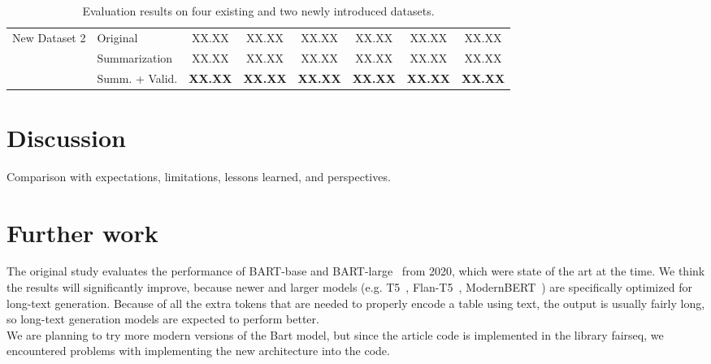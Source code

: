 \documentclass[12pt,a4paper]{article}
\begin{document}
\begin{table}[h]
\begin{tabular}{llccc|ccc}
        \midrule
        \multirow{3}{*}{New Dataset 2} 
        & Original & XX.XX & XX.XX & XX.XX & XX.XX & XX.XX & XX.XX \\
        & Summarization & XX.XX & XX.XX & XX.XX & XX.XX & XX.XX & XX.XX \\
        & Summ. + Valid. & \textbf{XX.XX} & \textbf{XX.XX} & \textbf{XX.XX} & \textbf{XX.XX} & \textbf{XX.XX} & \textbf{XX.XX} \\
        \bottomrule
    \end{tabular}
    \caption{Evaluation results on four existing and two newly introduced datasets.}
    \label{tab:results}
\end{table}

\section*{Discussion}

Comparison with expectations, limitations, lessons learned, and perspectives.

\section*{Further work}
The original study evaluates the performance of BART-base and BART-large~\cite{lewis2019bart} from 2020, which were state of the art at the time.  We think the results will significantly improve, because newer and larger models (e.g. T5~\cite{raffel2020exploring}, Flan-T5~\cite{chung2024scaling}, ModernBERT~\cite{warner2024smarter}) are specifically optimized for long-text generation. Because of all the extra tokens that are needed to properly encode a table using text, the output is usually fairly long, so long-text generation models are expected to perform better.
\ \\

We are planning to try more modern versions of the Bart model, but since the article code is implemented in the library fairseq, we encountered problems with implementing the new architecture into the code.




\end{document}
